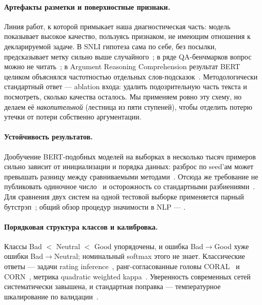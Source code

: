\documentclass{article}
\begin{document}
\paragraph{Артефакты разметки и поверхностные признаки.} Линия работ, к которой примыкает
наша диагностическая часть: модель показывает высокое качество, пользуясь признаком,
не имеющим отношения к декларируемой задаче. В SNLI гипотеза сама по себе, без посылки,
предсказывает метку сильно выше случайного~\cite{gururangan2018annotation,poliak2018hypothesis};
в ряде QA-бенчмарков вопрос можно не читать~\cite{kaushik2018much}; в Argument Reasoning
Comprehension результат BERT целиком объяснялся частотностью отдельных
слов-подсказок~\cite{niven2019probing}. Методологически стандартный ответ --- ablation
входа: удалить подозрительную часть текста и посмотреть, сколько качества осталось.
Мы применяем ровно эту схему, но делаем её \emph{накопительной} (лестница из пяти ступеней),
чтобы отделить потерю утечки от потери собственно аргументации.

\paragraph{Устойчивость результатов.} Дообучение BERT-подобных моделей на выборках
в несколько тысяч примеров сильно зависит от инициализации и порядка данных: разброс
по seed'ам может превышать разницу между сравниваемыми
методами~\cite{dodge2020fine,reimers2017reporting}. Отсюда же требование не публиковать
одиночное число~\cite{reimers2017reporting} и осторожность со стандартными
разбиениями~\cite{gorman2019we}. Для сравнения двух систем на одной тестовой выборке
применяется парный бутстрэп~\cite{koehn2004statistical,efron1993introduction};
общий обзор процедур значимости в NLP --- \cite{dror2018hitchhiker}.

\paragraph{Порядковая структура классов и калибровка.} Классы Bad $<$ Neutral $<$ Good
упорядочены, и ошибка Bad$\to$Good хуже ошибки Bad$\to$Neutral; номинальный softmax этого
не знает. Классические ответы --- задачи rating inference~\cite{pang2005seeing},
ранг-согласованные головы CORAL~\cite{cao2020rank} и CORN~\cite{shi2021deep}, метрика
quadratic weighted kappa~\cite{cohen1968weighted}. Уверенность современных сетей
систематически завышена, и стандартная поправка --- температурное
шкалирование по валидации~\cite{guo2017calibration}.
\end{document}
